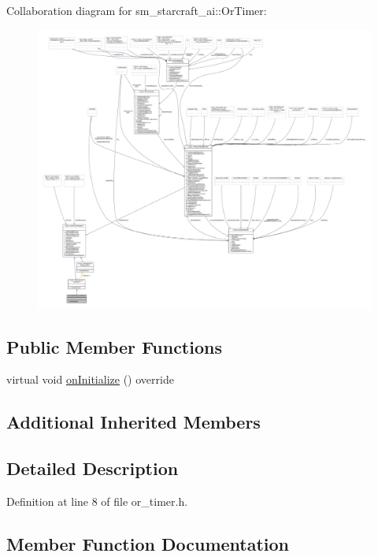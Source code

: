 Collaboration diagram for sm\+\_\+starcraft\+\_\+ai\+:\+:Or\+Timer\+:
\nopagebreak
\begin{figure}[H]
\begin{center}
\leavevmode
\includegraphics[width=350pt]{classsm__starcraft__ai_1_1OrTimer__coll__graph}
\end{center}
\end{figure}
\subsection*{Public Member Functions}
\begin{DoxyCompactItemize}
\item 
virtual void \hyperlink{classsm__starcraft__ai_1_1OrTimer_ab78cf9b6e7ba9a53f5454ffb007da71b}{on\+Initialize} () override
\end{DoxyCompactItemize}
\subsection*{Additional Inherited Members}


\subsection{Detailed Description}


Definition at line 8 of file or\+\_\+timer.\+h.



\subsection{Member Function Documentation}
